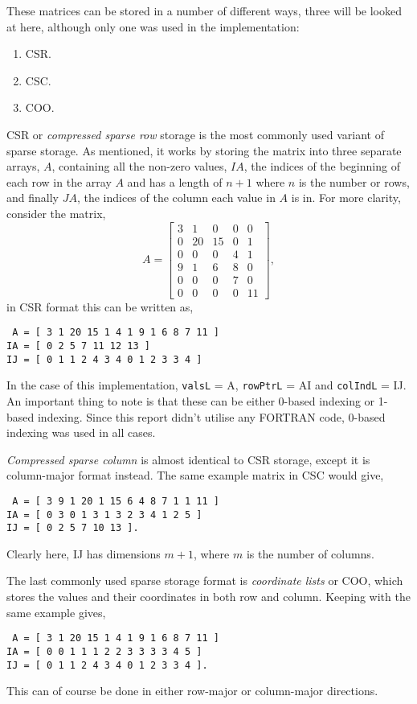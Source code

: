 These matrices can be stored in a number of different ways, three will be looked at here, although only one was used in the implementation:
\begin{enumerate}
	\item CSR.
	\item CSC.
	\item COO.
\end{enumerate}
CSR or \textit{compressed sparse row} storage is the most commonly used variant of sparse storage. As mentioned, it works by storing the matrix into three separate arrays, $A$, containing all the non-zero values, $IA$, the indices of the beginning of each row in the array $A$ and has a length of $n+1$ where $n$ is the number or rows, and finally $JA$, the indices of the column each value in $A$ is in. For more clarity, consider the matrix,
\begin{equation}
	A = 
	\left[\begin{matrix}
		3 & 1 & 0 & 0 & 0\\
		0 & 20 & 15 & 0 & 1\\
		0 & 0 & 0 & 4 & 1\\
		9 & 1 & 6 & 8 & 0\\
		0 & 0 & 0 & 7 & 0\\
		0 & 0 & 0 & 0 & 11
	\end{matrix}\right],
\end{equation}
in CSR format this can be written as,
\begin{lstlisting}
 A = [ 3 1 20 15 1 4 1 9 1 6 8 7 11 ]
IA = [ 0 2 5 7 11 12 13 ]
IJ = [ 0 1 1 2 4 3 4 0 1 2 3 3 4 ]
\end{lstlisting}
In the case of this implementation, \texttt{valsL} = A, \texttt{rowPtrL} = AI and \texttt{colIndL} = IJ. An important thing to note is that these can be either 0-based indexing or 1-based indexing. Since this report didn't utilise any FORTRAN code, 0-based indexing was used in all cases.

\textit{Compressed sparse column} is almost identical to CSR storage, except it is column-major format instead. The same example matrix in CSC would give,
\begin{lstlisting}
 A = [ 3 9 1 20 1 15 6 4 8 7 1 1 11 ]
IA = [ 0 3 0 1 3 1 3 2 3 4 1 2 5 ]
IJ = [ 0 2 5 7 10 13 ].
\end{lstlisting}
Clearly here, IJ has dimensions $m+1$, where $m$ is the number of columns.

The last commonly used sparse storage format is \textit{coordinate lists} or COO, which stores the values and their coordinates in both row and column. Keeping with the same example gives,
\begin{lstlisting}
 A = [ 3 1 20 15 1 4 1 9 1 6 8 7 11 ]
IA = [ 0 0 1 1 1 2 2 3 3 3 3 4 5 ]
IJ = [ 0 1 1 2 4 3 4 0 1 2 3 3 4 ].
\end{lstlisting}
This can of course be done in either row-major or column-major directions.
